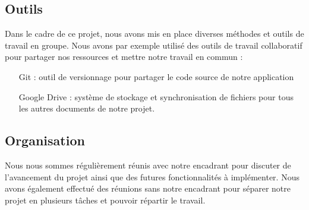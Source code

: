 \subsection{Outils}

Dans le cadre de ce projet, nous avons mis en place diverses méthodes et outils de travail en groupe. Nous avons par exemple utilisé des outils de travail collaboratif pour partager nos ressources et mettre notre travail en commun :
\begin{itemize}
        \item[Git] : outil de versionnage pour partager le code source de notre application
        \item[Google Drive] : système de stockage et synchronisation de fichiers pour tous les autres documents de notre projet.
\end{itemize}

\subsection{Organisation}

Nous nous sommes régulièrement réunis avec notre encadrant pour discuter de l’avancement du projet ainsi que des futures fonctionnalités à implémenter. Nous avons également effectué des réunions sans notre encadrant pour séparer notre projet en plusieurs tâches et pouvoir répartir le travail.



